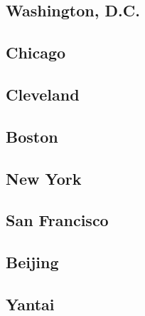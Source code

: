 \documentclass{article}
\begin{document}
    \subsection{Washington, D.C.}
    \begin{outline}
        
    \end{outline}
    \subsection{Chicago}
    \begin{outline}
        
    \end{outline}
    \subsection{Cleveland}
    \begin{outline}
        
    \end{outline}
    \subsection{Boston}
    \begin{outline}
        
    \end{outline}
    \subsection{New York}
    \begin{outline}
        
    \end{outline}
    \subsection{San Francisco}
    \begin{outline}
        
    \end{outline}
    \subsection{Beijing}
    \begin{outline}
        
    \end{outline}
    \subsection{Yantai}
    \begin{outline}

    \end{outline}
\end{document}
